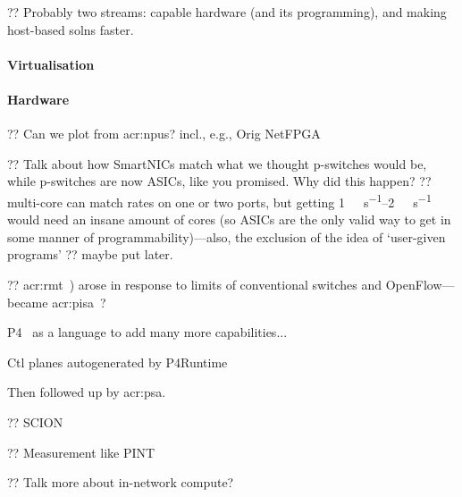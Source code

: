 ?? Probably two streams: capable hardware (and its programming), and making host-based solns faster.

\paragraph{Virtualisation}

\paragraph{Hardware}
?? Can we plot from \glspl{acr:npu}? incl., e.g., Orig NetFPGA~\parencite{DBLP:conf/mse/LockwoodMWGHNRL07}

?? Talk about how SmartNICs match what we thought p-switches would be, while p-switches are now ASICs, like you promised. Why did this happen? ?? multi-core can match rates on one or two ports, but getting \qtyrange{1}{2}{\tera\bit\per\second} would need an insane amount of cores (so ASICs are the only valid way to get in some manner of programmability)---also, the exclusion of the idea of `user-given programs' ?? maybe put later.

?? \gls{acr:rmt}~\parencite{DBLP:conf/sigcomm/BosshartGKVMIMH13}) arose in response to limits of conventional switches and OpenFlow---became \gls{acr:pisa}~\parencite{barefoot-pisa}?

P4~\parencite{DBLP:journals/ccr/BosshartDGIMRSTVVW14} as a language to add many more capabilities...

Ctl planes autogenerated by P4Runtime~\parencite{p4-runtime}

Then followed up by  \gls{acr:psa}\parencite{p4-psa}.

?? SCION~\parencite{DBLP:conf/conext/RuiterS21}

?? Measurement like PINT~\parencite{DBLP:conf/sigcomm/BasatRLAYM20}

?? Talk more about in-network compute?

